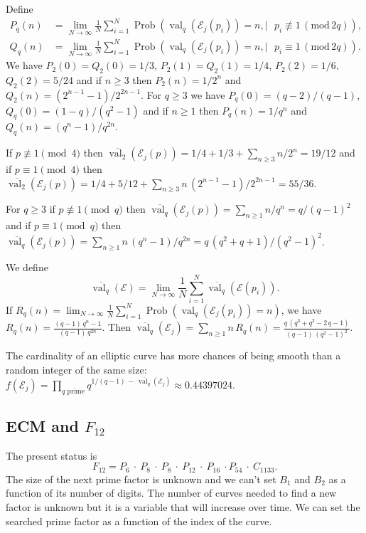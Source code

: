\documentclass[a4paper, 11pt, pdftex]{report}
\theoremstyle{plain}
\theoremstyle{definition}
\DeclareMathOperator{\val}{val}
\DeclareMathOperator{\Prob}{Prob}
\begin{document}
Define
\begin{align*}
P_q(n) &= \lim_{N \to \infty} \frac{1}{N} \sum_{i = 1}^N \Prob(\val_q(\mathcal{E}_j(p_i)) = n,
 |\text{ } p_i \not\equiv 1\, (\text{mod}\,2q)),\\
Q_q(n) &= \lim_{N \to \infty} \frac{1}{N} \sum_{i = 1}^N \Prob(\val_q(\mathcal{E}_j(p_i)) = n,
 |\text{ } p_i \equiv 1\, (\text{mod}\,2q)).
\end{align*}
We have $P_2(0) = Q_2(0) = 1/3$, $P_2(1) = Q_2(1) = 1/4$, $P_2(2) = 1/6$, $Q_2(2) = 5/24$ and
if $n \geq 3$ then $P_2(n) = 1/2^n$ and $Q_2(n) = (2^{n-1} - 1) / 2^{2n - 1}$. For $q \geq 3$
we have $P_q(0) = (q - 2)/(q - 1)$, $Q_q(0) = (1 - q) / (q^2 - 1)$ and if $n \geq 1$ then
$P_q(n) = 1/q^n$ and $Q_q(n) = (q^n - 1)/q^{2n}$.

If $p \not\equiv 1 \pmod{4}$ then $\overline{\val_2}(\mathcal{E}_j(p)) = 1/4 + 1/3
 + \sum_{n \geq 3} n / 2^n = 19 / 12$ and if $p \equiv 1 \pmod{4}$ then
 $\overline{\val_2}(\mathcal{E}_j(p)) = 1/4 + 5/12 + \sum_{n \geq 3} n\, (2^{n-1} - 1) / 2^{2n - 1}
 = 55 / 36$.
 
For $q \geq 3$ if $p \not\equiv 1 \pmod{q}$ then $\overline{\val_q}(\mathcal{E}_j(p))
 = \sum_{n \geq 1} n / q^n = q / (q - 1)^2$ and if $p \equiv 1 \pmod{q}$ then
$\overline{\val_q}(\mathcal{E}_j(p)) = \sum_{n \geq 1} n\, (q^n - 1)/q^{2n}
 = q\, (q^2 + q + 1) / (q^2 - 1)^2$.

We define
$$\overline{\val_q}(\mathcal{E})
 = \lim_{N \to \infty} \frac{1}{N} \sum_{i = 1}^N \overline{\val_q}(\mathcal{E}(p_i)).$$
If $R_q(n) = \lim_{N \to \infty} \frac{1}{N} \sum_{i = 1}^N \Prob(\val_q(\mathcal{E}_j(p_i)) = n)$,
we have $R_q(n) = \frac{(q - 1)\,q^n - 1}{(q - 1)\,q^{2n}}$.
Then $\overline{\val_q}(\mathcal{E}_j) = \sum_{n \geq 1} n\, R_q(n) =
\frac{q\, (q^3 + q^2 - 2\,q - 1)}{(q - 1)\,(q^2 - 1)^2}$.

The cardinality of an elliptic curve has more chances of being smooth than a random integer
of the same size: $f(\mathcal{E}_j) =
 \prod_{q\text{ prime}} q^{1/(q - 1)\, -\, \overline{\val_q}(\mathcal{E}_j)} \approx 0.44397024$.

\subsection{ECM and $F_{12}$}

The present status is
$$F_{12} = P_6 \:\cdot\: P_8 \:\cdot\: P_8 \:\cdot\: P_{12} \:\cdot\: P_{16} \:\cdot P_{54}
\:\cdot\: C_{1133}.$$
The size of the next prime factor is unknown and we can't set $B_1$ and $B_2$ as a function
of its number of digits. The number of curves needed to find a new factor is unknown but it
is a variable that will increase over time. We can set the searched prime factor as a function
of the index of the curve.
\end{document}
